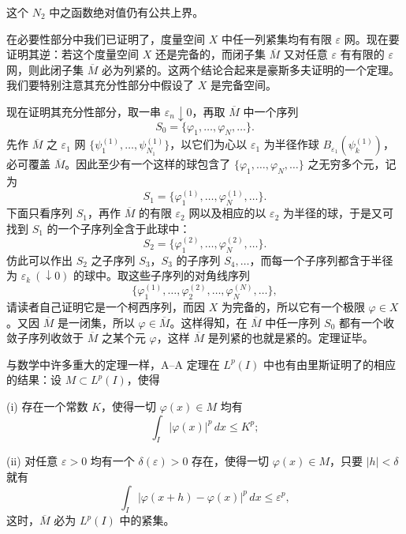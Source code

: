 这个 $N_2$ 中之函数绝对值仍有公共上界。

在必要性部分中我们已证明了，度量空间 $X$ 中任一列紧集均有有限 $\varepsilon$ 网。现在要证明其逆：若这个度量空间 $X$ 还是完备的，而闭子集 $\overline M$ 又对任意 $\varepsilon$ 有有限的 $\varepsilon$ 网，则此闭子集 $\overline M$ 必为列紧的。这两个结论合起来是豪斯多夫证明的一个定理。我们要特别注意其充分性部分中假设了 $X$ 是完备空间。

现在证明其充分性部分，取一串 $\varepsilon_n\downarrow0$，再取 $\overline M$ 中一个序列
\[
 S_0=\{\varphi_1,\ldots,\varphi_N,\ldots\}.
\]
先作 $\overline M$ 之 $\varepsilon_1$ 网 $\{\psi_1^{(1)},\ldots,\psi_{N_1}^{(1)}\}$，以它们为心以 $\varepsilon_1$ 为半径作球 $B_{\varepsilon_1}(\psi_k^{(1)})$，必可覆盖 $\overline M$。因此至少有一个这样的球包含了 $\{\varphi_1,\ldots,\varphi_N,\ldots\}$ 之无穷多个元，记为
\[
 S_1=\{\varphi_1^{(1)},\ldots,\varphi_N^{(1)},\ldots\}.
\]
下面只看序列 $S_1$，再作 $\overline M$ 的有限 $\varepsilon_2$ 网以及相应的以 $\varepsilon_2$ 为半径的球，于是又可找到 $S_1$ 的一个子序列全含于此球中：
\[
 S_2=\{\varphi_1^{(2)},\ldots,\varphi_N^{(2)},\ldots\}.
\]
仿此可以作出 $S_2$ 之子序列 $S_3$，$S_3$ 的子序列 $S_4,\ldots$，而每一个子序列都含于半径为 $\varepsilon_k\ (\downarrow0)$ 的球中。取这些子序列的对角线序列
\[
 \{\varphi_1^{(1)},\ldots,\varphi_2^{(2)},\ldots,\varphi_N^{(N)},\ldots\},
\]
请读者自己证明它是一个柯西序列，而因 $X$ 为完备的，所以它有一个极限 $\varphi\in X$。又因 $\overline M$ 是一闭集，所以 $\varphi\in\overline M$。这样得知，在 $\overline M$ 中任一序列 $S_0$ 都有一个收敛子序列收敛于 $\overline M$ 之某个元 $\varphi$，这样 $\overline M$ 是列紧的也就是紧的。定理证毕。

与数学中许多重大的定理一样，A--A 定理在 $L^p(I)$ 中也有由里斯证明了的相应的结果：设 $M\subset L^p(I)$，使得

\noindent(i) 存在一个常数 $K$，使得一切 $\varphi(x)\in M$ 均有
\[
 \int_I |\varphi(x)|^p\,dx\le K^p;
\]

\noindent(ii) 对任意 $\varepsilon>0$ 均有一个 $\delta(\varepsilon)>0$ 存在，使得一切 $\varphi(x)\in M$，只要 $|h|<\delta$ 就有
\begin{equation}
 \int_I |\varphi(x+h)-\varphi(x)|^p\,dx\le\varepsilon^p,
 \tag{9}
\end{equation}
这时，$\overline M$ 必为 $L^p(I)$ 中的紧集。


